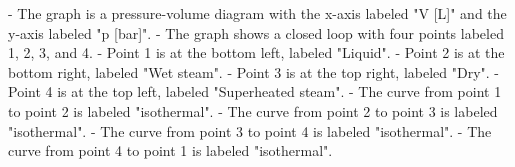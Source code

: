 - The graph is a pressure-volume diagram with the x-axis labeled "V [L]" and the y-axis labeled "p [bar]".
- The graph shows a closed loop with four points labeled 1, 2, 3, and 4.
- Point 1 is at the bottom left, labeled "Liquid".
- Point 2 is at the bottom right, labeled "Wet steam".
- Point 3 is at the top right, labeled "Dry".
- Point 4 is at the top left, labeled "Superheated steam".
- The curve from point 1 to point 2 is labeled "isothermal".
- The curve from point 2 to point 3 is labeled "isothermal".
- The curve from point 3 to point 4 is labeled "isothermal".
- The curve from point 4 to point 1 is labeled "isothermal".